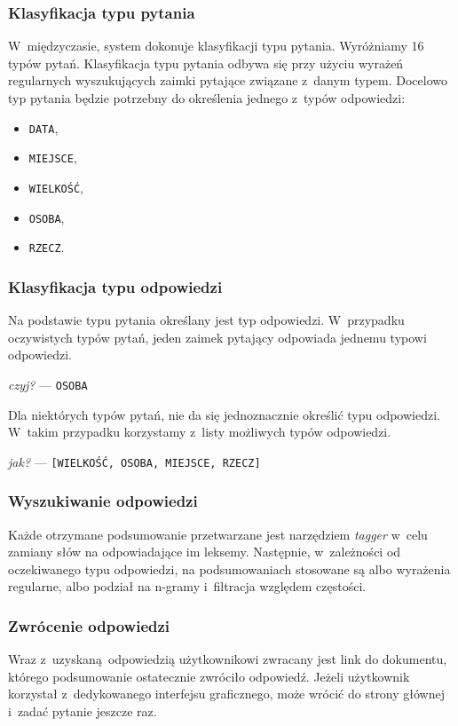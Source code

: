 \documentclass{beamer}
\begin{document}
\begin{frame}
  \frametitle{Klasyfikacja typu pytania}
  W~międzyczasie, system dokonuje klasyfikacji typu pytania. Wyróżniamy 16 typów pytań. Klasyfikacja typu pytania odbywa się przy użyciu wyrażeń regularnych wyszukujących zaimki pytające związane z~danym typem. Docelowo typ pytania będzie potrzebny do określenia jednego z~typów odpowiedzi:
  \begin{itemize}
    \item \texttt{DATA},
    \item \texttt{MIEJSCE},
    \item \texttt{WIELKOŚĆ},
    \item \texttt{OSOBA},
    \item \texttt{RZECZ}.
  \end{itemize}
\end{frame}

\begin{frame}
  \frametitle{Klasyfikacja typu odpowiedzi}
  Na podstawie typu pytania określany jest typ odpowiedzi. W~przypadku oczywistych typów pytań, jeden zaimek pytający odpowiada jednemu typowi odpowiedzi. 
  \begin{center}
    \textit{czyj?} --- \texttt{OSOBA}
  \end{center}
  Dla niektórych typów pytań, nie da się jednoznacznie określić typu odpowiedzi. W~takim przypadku korzystamy z~listy możliwych typów odpowiedzi.
  \begin{center}
    \textit{jak?} --- \texttt{[WIELKOŚĆ, OSOBA, MIEJSCE, RZECZ]}
  \end{center}
\end{frame}

\begin{frame}
  \frametitle{Wyszukiwanie odpowiedzi}
  Każde otrzymane podsumowanie przetwarzane jest narzędziem \textit{tagger} w~celu zamiany słów na odpowiadające im leksemy. Następnie, w~zależności od oczekiwanego typu odpowiedzi,
  na podsumowaniach stosowane są albo wyrażenia regularne, albo podział na n-gramy i~filtracja względem częstości.
\end{frame}

\begin{frame}
  \frametitle{Zwrócenie odpowiedzi}
  Wraz z~uzyskaną odpowiedzią użytkownikowi zwracany jest link do dokumentu, którego podsumowanie ostatecznie zwróciło odpowiedź. Jeżeli użytkownik korzystał z~dedykowanego interfejsu graficznego, może wrócić do strony głównej i~zadać pytanie jeszcze raz.
\end{frame}
\end{document}
